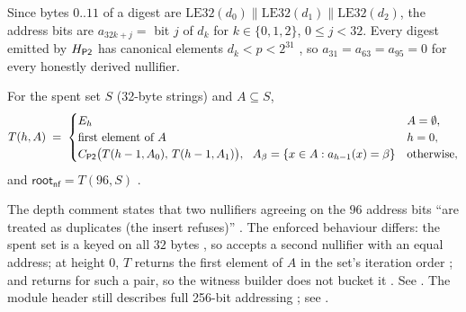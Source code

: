 Since bytes $0..11$ of a digest are $\mathrm{LE32}(d_0)\|\mathrm{LE32}(d_1)\|\mathrm{LE32}(d_2)$,
the address bits are $a_{32k+j} = $ bit $j$ of $d_k$ for $k \in \{0,1,2\}$,
$0 \le j < 32$. Every digest emitted by $H_{\mathsf{P2}}$ has canonical elements
$d_k < p < 2^{31}$ , so
$a_{31} = a_{63} = a_{95} = 0$ for every honestly derived nullifier.

\begin{definition}
For the spent set $S$ (32-byte strings) and $A \subseteq S$,
\begin{equation}
  T(h, A) \;=\;
  \begin{cases}
    E_h & A = \emptyset,\\
    \text{first element of } A & h = 0,\\
    C_{\mathsf{P2}}\big(T(h-1, A_0),\, T(h-1, A_1)\big), \ \ A_\beta = \{x \in A : a_{h-1}(x) = \beta\} & \text{otherwise},
  \end{cases}
\end{equation}
and $\mathsf{root}_{\mathsf{nf}} = T(96, S)$
.
\end{definition}

\begin{specdelta}
\label{delta:ss-smt-collide}
The depth comment states that two nullifiers agreeing on the $96$ address bits
``are treated as duplicates (the insert refuses)''
. The enforced behaviour
differs: the spent set is a  keyed on all $32$ bytes
, so  accepts
a second nullifier with an equal address; at height $0$, $T$ returns the first
element of $A$ in the set's iteration order
; and
 returns  for such a pair, so the
witness builder does not bucket it
. See
. The module header still describes full 256-bit addressing
; see .
\end{specdelta}

